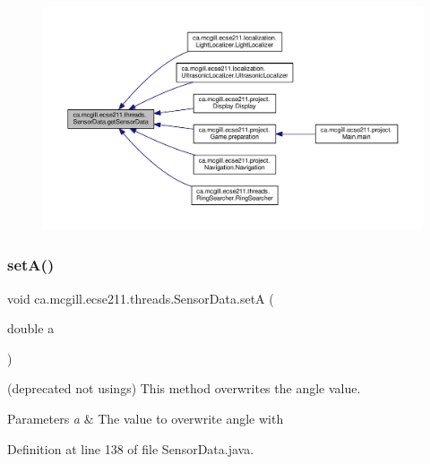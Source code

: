 \begin{figure}[H]
\begin{center}
\leavevmode
\includegraphics[width=350pt]{classca_1_1mcgill_1_1ecse211_1_1threads_1_1_sensor_data_a8260aba53b4474ca1275e4ce26157977_icgraph}
\end{center}
\end{figure}
\mbox{\label{classca_1_1mcgill_1_1ecse211_1_1threads_1_1_sensor_data_a35b1941d44e86b81eb7c625efbd3c8ba}} 
\subsubsection{\texorpdfstring{set\+A()}{setA()}}
{\footnotesize\ttfamily void ca.\+mcgill.\+ecse211.\+threads.\+Sensor\+Data.\+setA (\begin{DoxyParamCaption}\item[{double}]{a }\end{DoxyParamCaption})}

(deprecated not usings) This method overwrites the angle value.


\begin{DoxyParams}{Parameters}
{\em a} & The value to overwrite angle with \\
\hline
\end{DoxyParams}


Definition at line 138 of file Sensor\+Data.\+java.


